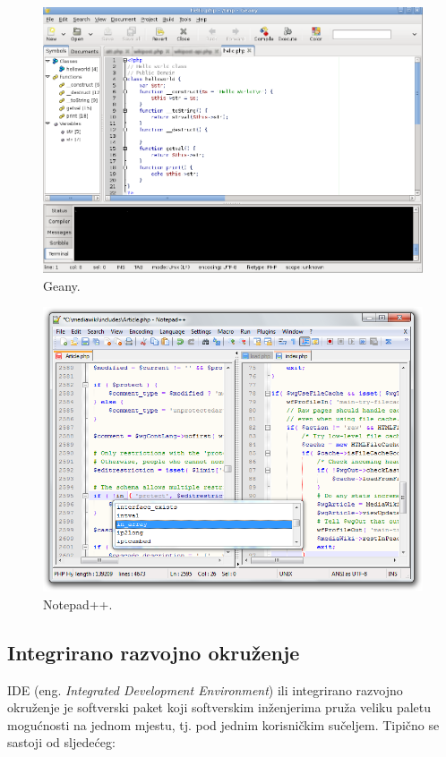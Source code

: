 \begin{figure}[h!]
    \caption{Geany.}
    \label{fig:geany}
    \centering
    \includegraphics[max width=\textwidth]{images/geany.png}
\end{figure}
\begin{figure}[h!]
    \caption{Notepad++.}
    \label{fig:notepadpp}
    \centering
    \includegraphics[max width=\textwidth]{images/notepadpp.png}
\end{figure}

\subsection{Integrirano razvojno okruženje}
IDE (eng. \emph{Integrated Development Environment}) ili integrirano razvojno okruženje je softverski paket koji softverskim inženjerima pruža veliku paletu mogućnosti na jednom mjestu, tj. pod jednim korisničkim sučeljem. Tipično se sastoji od sljedećeg:

